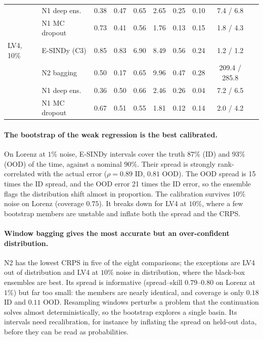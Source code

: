 \begin{table}[t]
\begin{tabular}{llcccccccc}
 & N1 deep ens. & 0.38 & 0.47 & 0.65 & 2.65 & 0.25 & 0.10 & 7.4 / 6.8 \\
 & N1 MC dropout & 0.73 & 0.41 & 0.56 & 1.76 & 0.13 & 0.15 & 1.8 / 4.3 \\
\midrule
LV4, 10\% & E-SINDy (C3) & 0.85 & 0.83 & 6.90 & 8.49 & 0.56 & 0.24 & 1.2 / 1.2 \\
 & N2 bagging & 0.50 & 0.17 & 0.65 & 9.96 & 0.47 & 0.28 & 209.4 / 285.8 \\
 & N1 deep ens. & 0.36 & 0.50 & 0.66 & 2.46 & 0.26 & 0.04 & 7.2 / 6.5 \\
 & N1 MC dropout & 0.67 & 0.51 & 0.55 & 1.81 & 0.12 & 0.14 & 2.0 / 4.2 \\
\bottomrule
\end{tabular}
\end{table}

\paragraph{The bootstrap of the weak regression is the best calibrated.} On Lorenz at $1\%$ noise, E-SINDy intervals cover the truth $87\%$ (ID) and $93\%$ (OOD) of the time, against a nominal $90\%$. Their spread is strongly rank-correlated with the actual error ($\rho=0.89$ ID, $0.81$ OOD). The OOD spread is 15 times the ID spread, and the OOD error 21 times the ID error, so the ensemble flags the distribution shift almost in proportion. The calibration survives $10\%$ noise on Lorenz (coverage $0.75$). It breaks down for LV4 at $10\%$, where a few bootstrap members are unstable and inflate both the spread and the CRPS.

\paragraph{Window bagging gives the most accurate but an over-confident distribution.} N2 has the lowest CRPS in five of the eight comparisons; the exceptions are LV4 out of distribution and LV4 at $10\%$ noise in distribution, where the black-box ensembles are best. Its spread is informative (spread--skill $0.79$--$0.80$ on Lorenz at $1\%$) but far too small: the members are nearly identical, and coverage is only $0.18$ ID and $0.11$ OOD. Resampling windows perturbs a problem that the continuation solves almost deterministically, so the bootstrap explores a single basin. Its intervals need recalibration, for instance by inflating the spread on held-out data, before they can be read as probabilities.

